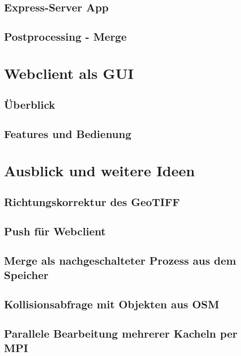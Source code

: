 \documentclass[10pt,a4paper]{report}
\begin{document}
\section{Express-Server App}
\section{Postprocessing - Merge}

\chapter{Webclient als GUI}
\section{Überblick}
\section{Features und Bedienung}
  
\chapter{Ausblick und weitere Ideen}
\section{Richtungskorrektur des GeoTIFF}
\section{Push für Webclient}
\section{Merge als nachgeschalteter Prozess aus dem Speicher}
\section{Kollisionsabfrage mit Objekten aus OSM}
\section{Parallele Bearbeitung mehrerer Kacheln per MPI}
\end{document}
